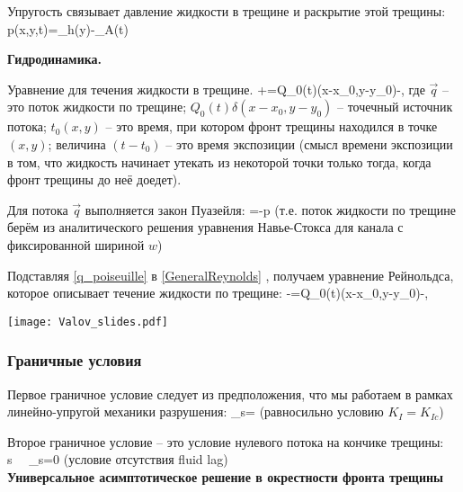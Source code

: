 \documentclass[main.tex]{subfiles}
\begin{document}
Упругость связывает давление жидкости в трещине и раскрытие этой трещины:
\beq
p(x,y,t)=\sigma_h(y)-\int\limits_{A(t)}
\eeq


\textbf{Гидродинамика.}

Уравнение для течения жидкости в трещине.
\beq\label{GeneralReynolds}
+=Q_0(t)\delta(x-x_0,y-y_0)-,
\eeq
где $\vec{q}$ -- это поток жидкости по трещине; $Q_0(t)\delta(x-x_0,y-y_0)$ -- точечный источник потока; $t_0(x,y)$ -- это время, при котором фронт трещины находился в точке $(x,y)$; величина $(t-t_0)$ -- это время экспозиции (смысл времени экспозиции в том, что жидкость начинает утекать из некоторой точки только тогда, когда фронт трещины до неё доедет).

Для потока $\vec{q}$ выполняется закон Пуазейля:
\beq\label{q_poiseuille}
=-\nabla p
\eeq
(т.е. поток жидкости по трещине берём из аналитического решения уравнения Навье-Стокса для канала с фиксированной шириной $w$)


Подставляя \eqref{q_poiseuille} в \eqref{GeneralReynolds} , получаем уравнение Рейнольдса, которое описывает течение жидкости по трещине:
\beq
{}-=Q_0(t)\delta(x-x_0,y-y_0)-,
\eeq

\begin{center}
\texttt{[image: Valov\_slides.pdf]}
\end{center}

\subsubsection{Граничные условия}

Первое граничное условие следует из предположения, что мы работаем в рамках линейно-упругой механики разрушения:
\beq
\lim\limits_{s}=
\eeq
(равносильно условию $K_{I}=K_{Ic}$)

Второе граничное условие -- это условие нулевого потока на кончике трещины:
\beq
{}\cdot{} s\,\,\,\Leftrightarrow\,\,\, \lim\limits_{s}{}=0
\eeq
(условие отсутствия fluid lag)
\\

\textbf{Универсальное асимптотическое решение в окрестности фронта трещины}
\end{document}

